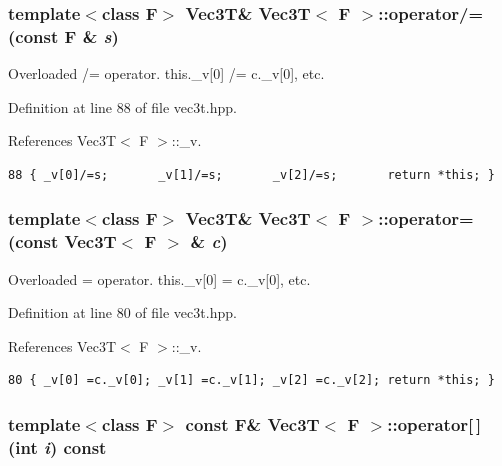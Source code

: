 \subsubsection{\setlength{\rightskip}{0pt plus 5cm}template$<$class F$>$ {\bf Vec3T}\& {\bf Vec3T}$<$ F $>$::operator/= (const F \& {\em s})\hspace{0.3cm}{\tt  [inline]}}\label{classVec3T_eb88f872395a552abe9854728f4d5eac_eb88f872395a552abe9854728f4d5eac}


Overloaded /= operator. this.\_\-v[0] /= c.\_\-v[0], etc. 

Definition at line 88 of file vec3t.hpp.

References Vec3T$<$ F $>$::\_\-v.

\footnotesize\begin{verbatim}88 { _v[0]/=s;       _v[1]/=s;       _v[2]/=s;       return *this; }
\end{verbatim}\normalsize 


\subsubsection{\setlength{\rightskip}{0pt plus 5cm}template$<$class F$>$ {\bf Vec3T}\& {\bf Vec3T}$<$ F $>$::operator= (const {\bf Vec3T}$<$ F $>$ \& {\em c})\hspace{0.3cm}{\tt  [inline]}}\label{classVec3T_b157d8441f014e1177994de6a229b1f0_b157d8441f014e1177994de6a229b1f0}


Overloaded = operator. this.\_\-v[0] = c.\_\-v[0], etc. 

Definition at line 80 of file vec3t.hpp.

References Vec3T$<$ F $>$::\_\-v.

\footnotesize\begin{verbatim}80 { _v[0] =c._v[0]; _v[1] =c._v[1]; _v[2] =c._v[2]; return *this; }
\end{verbatim}\normalsize 


\subsubsection{\setlength{\rightskip}{0pt plus 5cm}template$<$class F$>$ const F\& {\bf Vec3T}$<$ F $>$::operator[$\,$] (int {\em i}) const\hspace{0.3cm}{\tt  [inline]}}\label{classVec3T_56bd1e633f412f07706e05b60f9eb2bc_56bd1e633f412f07706e05b60f9eb2bc}


